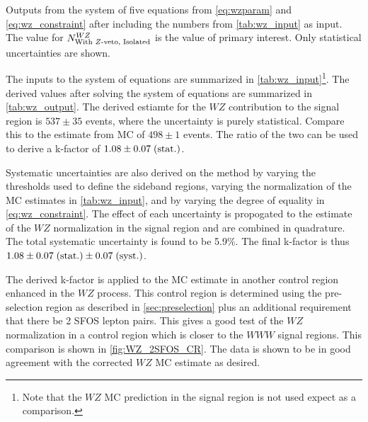 \begin{table}
\centering

\caption{Outputs from the system of five equations
from \eqn\eqref{eq:wzparam} and \eqn\eqref{eq:wz_constraint}
after including the numbers from \tab\ref{tab:wz_input} as input.
The value for $N^{WZ}_{\textrm{With \ensuremath{Z}-veto, Isolated}}$ is 
the value of primary interest.  Only statistical uncertainties are shown.}
\label{tab:wz_output}
\end{table}


The inputs to the system of equations are summarized in 
\tab\ref{tab:wz_input}\footnote{Note that the $WZ$ MC prediction in 
the signal region is not used expect as a comparison.}.
The derived values after solving the system of equations are
summarized in \tab\ref{tab:wz_output}. 
The derived estiamte for the $WZ$ contribution to 
the signal region is 
$537 \pm 35$
events, where the uncertainty is purely statistical. 
Compare this to the estimate from MC of 
$498 \pm 1$ events.
The ratio of the two can be used to derive a k-factor of
$1.08\pm0.07\mbox{$\;$(stat.)}$.


Systematic uncertainties are also derived on the method
by varying the 
thresholds used to define the sideband regions, varying the normalization
of the MC estimates in \tab\ref{tab:wz_input}, and by varying the degree
of equality in \eqn\eqref{eq:wz_constraint}. The effect of each
uncertainty is propogated to the estimate of the $WZ$ normalization in
the signal region and are combined in quadrature. The total systematic
uncertainty is found to be 5.9\%. 
The final k-factor is thus $1.08 \pm0.07\mbox{$\;$(stat.)}\pm0.07\mbox{$\;$(syst.)}$.

The derived k-factor is applied to the MC estimate in another control
region enhanced in the $WZ$ process. This control region is determined
using the pre-selection region as described in \sec\ref{sec:preselection}
plus an additional requirement that there be 2 SFOS lepton pairs.
This gives a good test of the $WZ$ normalization in a control region
which is closer to the $WWW$ signal regions. 
This comparison is shown in \fig\ref{fig:WZ_2SFOS_CR}. 
The data is shown to be in good agreement with the corrected $WZ$ MC
estimate as desired.

